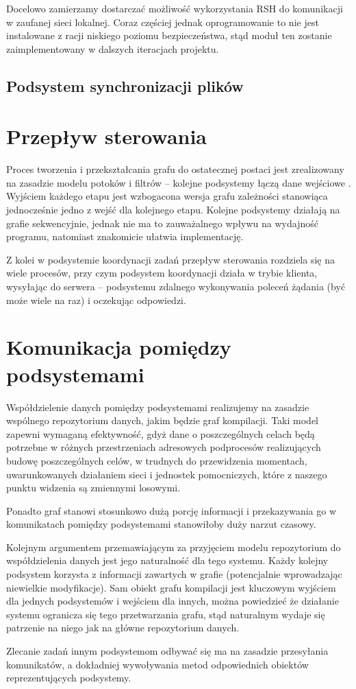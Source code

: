 \documentclass[a4paper]{article}
\begin{document}
Docelowo zamierzamy dostarczać możliwość wykorzystania RSH do komunikacji w zaufanej sieci lokalnej.
Coraz częściej jednak oprogramowanie to nie jest instalowane z racji niskiego poziomu bezpieczeństwa, stąd moduł ten zostanie zaimplementowany w dalszych iteracjach projektu.

\subsection{Podsystem synchronizacji plików}


\section{Przepływ sterowania}


Proces tworzenia i przekształcania grafu do ostatecznej postaci jest zrealizowany na zasadzie modelu potoków i filtrów -- kolejne podsystemy łączą dane wejściowe .
Wyjściem każdego etapu jest wzbogacona wersja grafu zależności stanowiąca jednocześnie jedno z wejść dla kolejnego etapu.
Kolejne podsystemy działają na grafie sekwencyjnie, jednak nie ma to zauważalnego wpływu na wydajność programu, natomiast znakomicie ułatwia implementację.

Z kolei w podsystemie koordynacji zadań przepływ sterowania rozdziela się na wiele procesów, przy czym podsystem koordynacji działa w trybie klienta, wysyłając do serwera -- podsystemu zdalnego wykonywania poleceń żądania (być może wiele na raz) i oczekując odpowiedzi.

\section{Komunikacja pomiędzy podsystemami}

Współdzielenie danych pomiędzy podsystemami realizujemy na zasadzie wspólnego repozytorium danych, jakim będzie graf kompilacji.
Taki model zapewni wymaganą efektywność, gdyż dane o poszczególnych celach będą potrzebne w różnych przestrzeniach adresowych podprocesów realizujących budowę poszczególnych celów, w trudnych do przewidzenia momentach, uwarunkowanych działaniem sieci i jednostek pomocniczych, które z naszego punktu widzenia są zmiennymi losowymi.

Ponadto graf stanowi stosunkowo dużą porcję informacji i przekazywania go w komunikatach pomiędzy podsystemami stanowiłoby duży narzut czasowy.

Kolejnym argumentem przemawiającym za przyjęciem modelu repozytorium do współdzielenia danych jest jego naturalność dla tego systemu.
Każdy kolejny podsystem korzysta z informacji zawartych w grafie (potencjalnie wprowadzając niewielkie modyfikacje).
Sam obiekt grafu kompilacji jest kluczowym wyjściem dla jednych podsystemów i wejściem dla innych, można powiedzieć że działanie systemu ogranicza się tego przetwarzania grafu, stąd naturalnym wydaje się patrzenie na niego jak na główne repozytorium danych.

Zlecanie zadań innym podsystemom odbywać się ma na zasadzie przesyłania komunikatów, a dokładniej wywoływania metod odpowiednich obiektów reprezentujących podsystemy.
\end{document}
